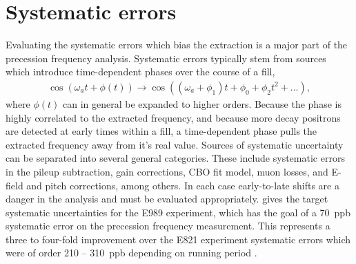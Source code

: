 
\thispagestyle{myheadings}

\graphicspath{{Body/Figures/Wa/Datasets/Endgame/LostMuonFiles/MainCuts/}{Body/Figures/Wa/Datasets/ComparisonPlots/LostMuons/}{Body/Figures/Wa/Datasets/9d/SingleIteration/LostMuonFits/}{Body/Figures/Wa/Datasets/9d/PileupJobs/PileupGapTime/}{Body/Figures/Wa/Datasets/9d/PileupJobs/PileupDeadTime/auto-scaling/}{Body/Figures/Wa/Datasets/9d/PileupJobs/PileupDeadTime/fixed-scaling/}{Body/Figures/Wa/Datasets/9d/PileupJobs/PileupEnergyScale/}{Body/Figures/Wa/Datasets/9d/PileupJobs/PileupTimeShift/}{Body/Figures/Wa/Datasets/9d/SingleIteration/PileupMultiplierScan/}{Body/Figures/Wa/Datasets/60h/RatioConstruction/Ta/}{Body/Figures/Wa/Datasets/60h/RatioConstruction/TauMu/}{Body/Figures/Wa/Datasets/9d/Binning/BinEdge/}{Body/Figures/Wa/Datasets/9d/Binning/BinWidth/}{Body/Figures/Wa/Datasets/60h/Gain/0p25-steps/}}




\section{Systematic errors}
\label{sec:SystematicErrors}


Evaluating the systematic errors which bias the \wa extraction is a major part of the precession frequency analysis. Systematic errors typically stem from sources which introduce time-dependent phases over the course of a fill,
    \begin{align} \label{eq:timeDependentPhase}
        \cos{(\omega_{a}t + \phi(t))} \rightarrow \cos{((\omega_{a}+\phi_{1})t + \phi_{0} + \phi_{2}t^{2} + ...)},
    \end{align}
where $\phi(t)$ can in general be expanded to higher orders. Because the phase is highly correlated to the extracted frequency, and because more decay positrons are detected at early times within a fill, a time-dependent phase pulls the extracted frequency away from it's real value. Sources of systematic uncertainty can be separated into several general categories. These include systematic errors in the pileup subtraction,  gain corrections, CBO fit model, muon losses, and E-field and pitch corrections, among others. In each case early-to-late shifts are a danger in the analysis and must be evaluated appropriately.  gives the target systematic uncertainties for the E989 experiment, which has the goal of a \SI{70}{ppb} systematic error on the precession frequency measurement. This represents a three to four-fold improvement over the E821 experiment systematic errors which were of order \SI{210}{} -- \SI{310}{ppb} depending on running period \cite{E821FinalReport}.

